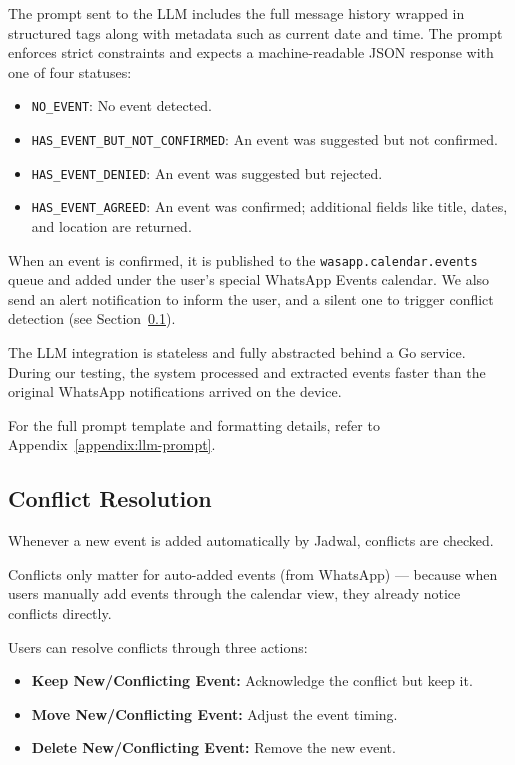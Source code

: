 The prompt sent to the LLM includes the full message history wrapped in structured tags along with metadata such as current date and time. The prompt enforces strict constraints and expects a machine-readable JSON response with one of four statuses:

\begin{itemize}
    \item \texttt{NO\_EVENT}: No event detected.
    \item \texttt{HAS\_EVENT\_BUT\_NOT\_CONFIRMED}: An event was suggested but not confirmed.
    \item \texttt{HAS\_EVENT\_DENIED}: An event was suggested but rejected.
    \item \texttt{HAS\_EVENT\_AGREED}: An event was confirmed; additional fields like title, dates, and location are returned.
\end{itemize}

When an event is confirmed, it is published to the \texttt{wasapp.calendar.events} queue and added under the user’s special WhatsApp Events calendar. We also send an alert notification to inform the user, and a silent one to trigger conflict detection (see Section~\ref{subsec:conflict-resolution}).

The LLM integration is stateless and fully abstracted behind a Go service. During our testing, the system processed and extracted events faster than the original WhatsApp notifications arrived on the device.

For the full prompt template and formatting details, refer to Appendix~\ref{appendix:llm-prompt}.

\subsection{Conflict Resolution} \label{subsec:conflict-resolution}

Whenever a new event is added automatically by Jadwal, conflicts are checked.

Conflicts only matter for auto-added events (from WhatsApp) — because when users manually add events through the calendar view, they already notice conflicts directly.

Users can resolve conflicts through three actions:
\begin{itemize}
    \item \textbf{Keep New/Conflicting Event:} Acknowledge the conflict but keep it.
    \item \textbf{Move New/Conflicting Event:} Adjust the event timing.
    \item \textbf{Delete New/Conflicting Event:} Remove the new event.
\end{itemize}

